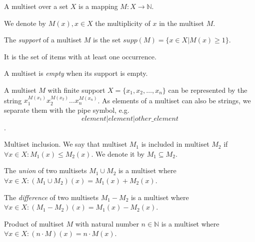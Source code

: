\begin{definition}
A multiset over a set $X$ is a mapping $M: X\rightarrow \mathbb N$.
\end{definition}

We denote by $M(x), x\in X$ the multiplicity of $x$ in the multiset $M$.

\begin{definition}
The {\em support} of a multiset $M$ is the set $supp(M)=\{x\in X|M(x)\geq 1\}$.
\end{definition}

It is the set of items with at least one occurrence.

\begin{definition}
A multiset is {\em empty} when its support is empty.
\end{definition}

A multiset $M$ with finite support $X = \{x_1, x_2, \ldots, x_n\}$ can be represented by the string $x_1^{M(x_1)}x_2^{M(x_2)}\ldots x_n^{M(x_n)}$.
As elements of a multiset can also be strings, we separate them with the pipe symbol, e.g. $$element|element|other\_element$$.

\begin{definition}
Multiset inclusion. We say that multiset $M_1$ is included in multiset $M_2$ if $\forall x \in X: M_1(x)\leq M_2(x)$. We denote it by $M_1\subseteq M_2$.
\end{definition}

\begin{definition}
The {\em union} of two multisets $M_1\cup M_2$ is a multiset where $\forall x \in X: (M_1\cup M_2)(x)=M_1(x)+M_2(x)$.
\end{definition}

\begin{definition}
The {\em difference} of two multisets $M_1-M_2$ is a multiset where $\forall x \in X: (M_1-M_2)(x)=M_1(x)-M_2(x)$.
\end{definition}

\begin{definition}
Product of multiset $M$ with natural number $n\in \mathbb N$ is a multiset where $\forall x \in X: (n\cdot M)(x)=n\cdot M(x)$.  
\end{definition}
